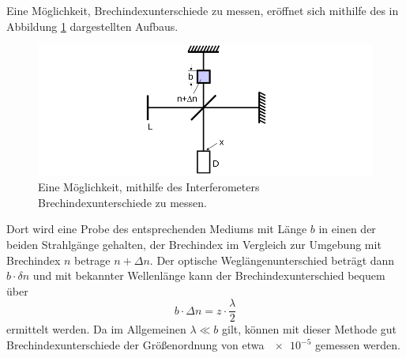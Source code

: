 Eine Möglichkeit, Brechindexunterschiede zu messen, eröffnet sich mithilfe des in Abbildung \ref{fig:Brechindex_messen} 
dargestellten Aufbaus. 
\begin{figure}
    \centering
    \includegraphics[width=\textwidth]{plots/Brechindex_messen.png}
    \caption{Eine Möglichkeit, mithilfe des Interferometers Brechindexunterschiede zu messen.}
    \label{fig:Brechindex_messen}
\end{figure}
Dort wird eine Probe des entsprechenden Mediums mit Länge $b$ in einen der beiden Strahlgänge gehalten, der Brechindex 
im Vergleich zur Umgebung mit Brechindex $n$ betrage $n+\Delta n$.
Der optische Weglängenunterschied beträgt dann $b\cdot \delta n$ und mit bekannter Wellenlänge kann der Brechindexunterschied 
bequem über 
\begin{equation}
    b\cdot \Delta n=z\cdot \frac{\lambda}{2}
    \label{eqn:b}
\end{equation}
ermittelt werden. 
Da im Allgemeinen $\lambda \ll b$ gilt, können mit dieser Methode gut Brechindexunterschiede der Größenordnung von etwa $\num{e-5}$ gemessen werden. 
